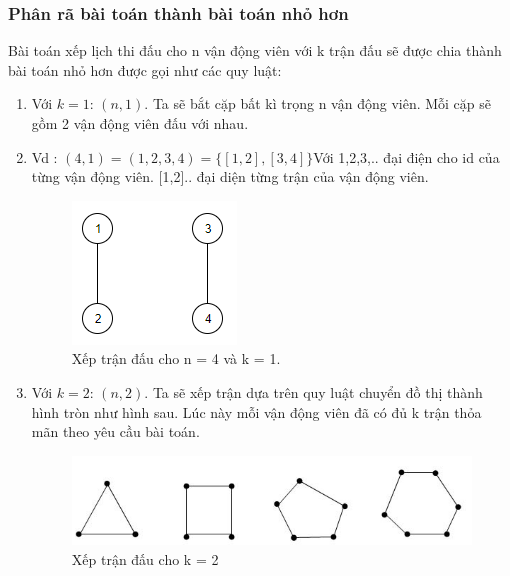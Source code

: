 \documentclass[13pt,a4paper]{article}
\begin{document}
\subsubsection{Phân rã bài toán thành bài toán nhỏ hơn}
Bài toán xếp lịch thi đấu cho n vận động viên với k trận đấu sẽ được chia thành bài toán nhỏ hơn được gọi như các quy luật:
\begin{enumerate}
	\item Với $k = 1$: $(n, 1)$. Ta sẽ bắt cặp bất kì trọng n vận động viên. Mỗi cặp sẽ gồm 2 vận động viên đấu với nhau.
	\item[] Vd : $(4, 1)= (1,2,3,4) = \lbrace [1, 2], [3, 4] \rbrace$Với 1,2,3,.. đại điện cho id của từng vận động viên. [1,2].. đại diện từng trận của vận động viên.	
	\begin{figure}[H]
	 	\centering
	 	\includegraphics[scale=0.7]{./image/k1.png}
	 	\caption{Xếp trận đấu cho n = 4 và k = 1.}
	 \end{figure}
	 
	\item Với $k = 2$: $(n, 2)$. Ta sẽ xếp trận dựa trên quy luật chuyển đồ thị thành hình tròn như hình sau. Lúc này mỗi vận động viên đã có đủ k trận thỏa mãn theo yêu cầu bài toán.
	 \begin{figure}[H]
	 	\centering
	 	\includegraphics[scale=0.7]{./image/dothivong.png}
	 	\caption{Xếp trận đấu cho k = 2}
	 \end{figure}
	 

\end{enumerate}
\end{document}
